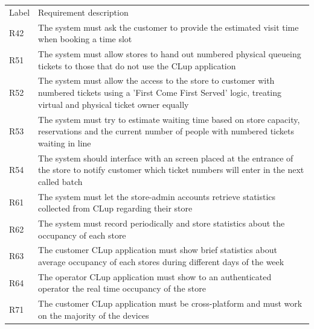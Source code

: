 \begin{tabular}{C{1cm}L{14.1cm}}
    Label & Requirement description                                                                                                                                                         \\
    R42   & The system  must ask the customer to provide the estimated visit time when booking a time slot                                                                                  \\
    R51   & The system must allow stores to hand out numbered physical queueing tickets to those that do not use the CLup application                                                       \\
    R52   & The system must allow the access to the store to customer with numbered tickets using a 'First Come First Served' logic, treating virtual and physical ticket owner equally       \\
    R53   & The system must try to estimate waiting time based on store capacity, reservations and the current number of people with numbered tickets waiting in line                       \\
    R54   & The system should interface with an screen placed at the entrance of the store to notify customer which ticket numbers will enter in the next called batch                                              \\
    R61   & The system must let the store-admin accounts retrieve statistics collected from CLup regarding their store                                                                      \\
    R62   & The system must record periodically and store statistics about the occupancy of each store                                                                                      \\
    R63   & The customer CLup application must show brief statistics about average occupancy of each stores during different days of the week                                               \\
    R64   & The operator CLup application must show to an authenticated operator the real time occupancy of the store                                                                       \\
    R71   & The customer CLup application must be cross-platform and must work on the majority of the devices                                                                               \\

\end{tabular}
